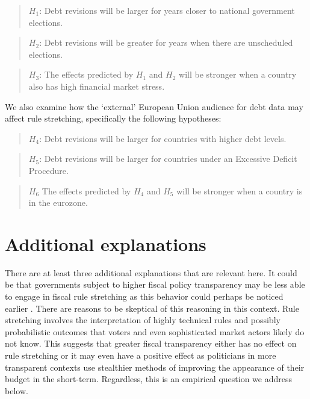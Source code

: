 \documentclass[]{article}
\begin{document}
\begin{quote}
    $H_{1}$: Debt revisions will be larger for years closer to national government elections.
\end{quote}

\begin{quote}
    $H_{2}$: Debt revisions will be greater for years when there are unscheduled elections.
\end{quote}

\begin{quote}
    $H_{3}$: The effects predicted by $H_{1}$ and $H_{2}$ will be stronger when a country also has high financial market stress.
\end{quote}

We also examine how the `external' European Union audience for debt data may affect rule stretching, specifically the following hypotheses:

\begin{quote}
    $H_{4}$: Debt revisions will be larger for countries with higher debt levels.
\end{quote}

\begin{quote}
    $H_{5}$: Debt revisions will be larger for countries under an Excessive Deficit Procedure.
\end{quote}

\begin{quote}
	$H_{6}$ The effects predicted by $H_{4}$ and $H_{5}$ will be stronger when a country is in the eurozone.
\end{quote}

\section{Additional explanations}

There are at least three additional explanations that are relevant here. It could be that governments subject to higher fiscal policy transparency may be less able to engage in fiscal rule stretching as this behavior could perhaps be noticed earlier \citep[e.g.][]{Alt2014}. There are reasons to be skeptical of this reasoning in this context. Rule stretching involves the interpretation of highly technical rules and possibly probabilistic outcomes that voters and even sophisticated market actors likely do not know. This suggests that greater fiscal transparency either has no effect on rule stretching or it may even have a positive effect as politicians in more transparent contexts use stealthier methods of improving the appearance of their budget in the short-term. Regardless, this is an empirical question we address below.
\end{document}
